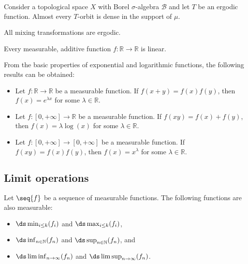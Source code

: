     \begin{property}
        Consider a topological space $X$ with Borel $\sigma$-algebra $\mathcal{B}$ and let $T$ be an ergodic function. Almost every $T$-orbit is dense in the support of $\mu$.
    \end{property}

    \begin{property}
        All mixing transformations are ergodic.
    \end{property}

    \begin{property}[Additivity]
        Every measurable, additive function $f:\mathbb{R}\rightarrow\mathbb{R}$ is linear.
    \end{property}
    \begin{result}
        From the basic properties of exponential and logarithmic functions, the following results can be obtained:
        \begin{itemize}
            \item Let $f:\mathbb{R}\rightarrow\mathbb{R}$ be a measurable function. If $f(x+y) = f(x)f(y)$, then $f(x)=e^{\lambda x}$ for some $\lambda\in\mathbb{R}$.
            \item Let $f:[0,+\infty]\rightarrow\mathbb{R}$ be a measurable function. If $f(xy) = f(x)+f(y)$, then $f(x)=\lambda\log(x)$ for some $\lambda\in\mathbb{R}$.
            \item Let $f:[0,+\infty]\rightarrow[0,+\infty]$ be a measurable function. If $f(xy) = f(x)f(y)$, then $f(x)=x^\lambda$ for some $\lambda\in\mathbb{R}$.
        \end{itemize}
    \end{result}

\subsection{Limit operations}

    \begin{property}
        Let $\seq{f}$ be a sequence of measurable functions. The following functions are also measurable:
        \begin{itemize}
            \item $\ds\min_{i\leq k}(f_i)$ and $\ds\max_{i\leq k}(f_i)$,
            \item $\ds\inf_{n\in\mathbb{N}}(f_n)$ and $\ds\sup_{n\in\mathbb{N}}(f_n)$, and
            \item $\ds\liminf_{n\rightarrow\infty}(f_n)$ and $\ds\limsup_{n\rightarrow\infty}(f_n)$.
        \end{itemize}
    \end{property}

